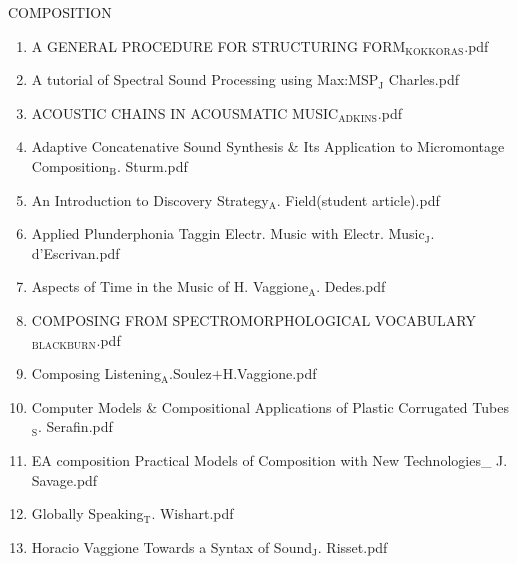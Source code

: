 \documentclass[11pt]{article}
\begin{document}
\item COMPOSITION
\label{sec-1-1-1-1-49-1-6}
\begin{enumerate}
\item A GENERAL PROCEDURE FOR STRUCTURING FORM$_{\text{KOKKORAS}}$.pdf
\label{sec-1-1-1-1-49-1-6-1}

\item A tutorial of Spectral Sound Processing using Max:MSP$_{\text{J}}$ Charles.pdf
\label{sec-1-1-1-1-49-1-6-2}

\item ACOUSTIC CHAINS IN ACOUSMATIC MUSIC$_{\text{ADKINS}}$.pdf
\label{sec-1-1-1-1-49-1-6-3}

\item Adaptive Concatenative Sound Synthesis \& Its Application to Micromontage Composition$_{\text{B}}$. Sturm.pdf
\label{sec-1-1-1-1-49-1-6-4}

\item An Introduction to Discovery Strategy$_{\text{A}}$. Field(student article).pdf
\label{sec-1-1-1-1-49-1-6-5}

\item Applied Plunderphonia Taggin Electr. Music with Electr. Music$_{\text{J}}$. d'Escrivan.pdf
\label{sec-1-1-1-1-49-1-6-6}

\item Aspects of Time in the Music of H. Vaggione$_{\text{A}}$. Dedes.pdf
\label{sec-1-1-1-1-49-1-6-7}

\item COMPOSING FROM SPECTROMORPHOLOGICAL VOCABULARY$_{\text{BLACKBURN}}$.pdf
\label{sec-1-1-1-1-49-1-6-8}

\item Composing Listening$_{\text{A}}$.Soulez+H.Vaggione.pdf
\label{sec-1-1-1-1-49-1-6-9}

\item Computer Models \& Compositional Applications of Plastic Corrugated Tubes$_{\text{S}}$. Serafin.pdf
\label{sec-1-1-1-1-49-1-6-10}

\item EA composition Practical Models of Composition with New Technologies\_ J. Savage.pdf
\label{sec-1-1-1-1-49-1-6-11}

\item Globally Speaking$_{\text{T}}$. Wishart.pdf
\label{sec-1-1-1-1-49-1-6-12}

\item Horacio Vaggione Towards a Syntax of Sound$_{\text{J}}$. Risset.pdf
\label{sec-1-1-1-1-49-1-6-13}


\end{enumerate}
\end{document}
